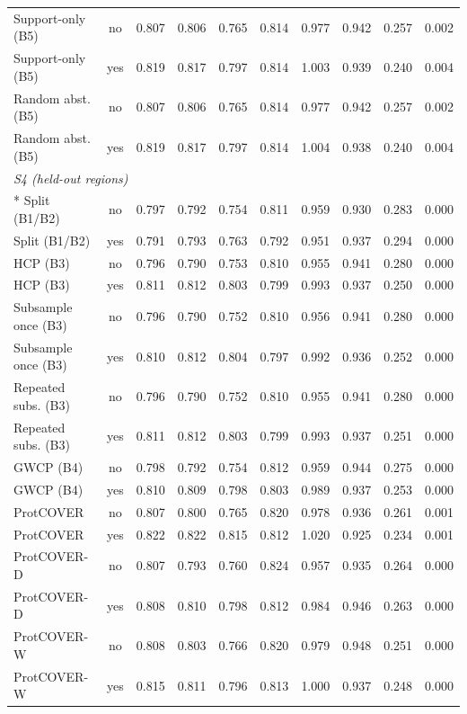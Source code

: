 \begin{longtable}{lccccccccc}
Support-only (B5) & no & 0.807 & 0.806 & 0.765 & 0.814 & 0.977 & 0.942 & 0.257 & 0.002 \\
Support-only (B5) & yes & 0.819 & 0.817 & 0.797 & 0.814 & 1.003 & 0.939 & 0.240 & 0.004 \\
Random abst. (B5) & no & 0.807 & 0.806 & 0.765 & 0.814 & 0.977 & 0.942 & 0.257 & 0.002 \\
Random abst. (B5) & yes & 0.819 & 0.817 & 0.797 & 0.814 & 1.004 & 0.938 & 0.240 & 0.004 \\
\midrule
\multicolumn{10}{l}{\emph{S4 (held-out regions)}}\\*
Split (B1/B2) & no & 0.797 & 0.792 & 0.754 & 0.811 & 0.959 & 0.930 & 0.283 & 0.000 \\
Split (B1/B2) & yes & 0.791 & 0.793 & 0.763 & 0.792 & 0.951 & 0.937 & 0.294 & 0.000 \\
HCP (B3) & no & 0.796 & 0.790 & 0.753 & 0.810 & 0.955 & 0.941 & 0.280 & 0.000 \\
HCP (B3) & yes & 0.811 & 0.812 & 0.803 & 0.799 & 0.993 & 0.937 & 0.250 & 0.000 \\
Subsample once (B3) & no & 0.796 & 0.790 & 0.752 & 0.810 & 0.956 & 0.941 & 0.280 & 0.000 \\
Subsample once (B3) & yes & 0.810 & 0.812 & 0.804 & 0.797 & 0.992 & 0.936 & 0.252 & 0.000 \\
Repeated subs. (B3) & no & 0.796 & 0.790 & 0.752 & 0.810 & 0.955 & 0.941 & 0.280 & 0.000 \\
Repeated subs. (B3) & yes & 0.811 & 0.812 & 0.803 & 0.799 & 0.993 & 0.937 & 0.251 & 0.000 \\
GWCP (B4) & no & 0.798 & 0.792 & 0.754 & 0.812 & 0.959 & 0.944 & 0.275 & 0.000 \\
GWCP (B4) & yes & 0.810 & 0.809 & 0.798 & 0.803 & 0.989 & 0.937 & 0.253 & 0.000 \\
ProtCOVER & no & 0.807 & 0.800 & 0.765 & 0.820 & 0.978 & 0.936 & 0.261 & 0.001 \\
ProtCOVER & yes & 0.822 & 0.822 & 0.815 & 0.812 & 1.020 & 0.925 & 0.234 & 0.001 \\
ProtCOVER-D & no & 0.807 & 0.793 & 0.760 & 0.824 & 0.957 & 0.935 & 0.264 & 0.000 \\
ProtCOVER-D & yes & 0.808 & 0.810 & 0.798 & 0.812 & 0.984 & 0.946 & 0.263 & 0.000 \\
ProtCOVER-W & no & 0.808 & 0.803 & 0.766 & 0.820 & 0.979 & 0.948 & 0.251 & 0.000 \\
ProtCOVER-W & yes & 0.815 & 0.811 & 0.796 & 0.813 & 1.000 & 0.937 & 0.248 & 0.000 \\

\end{longtable}
